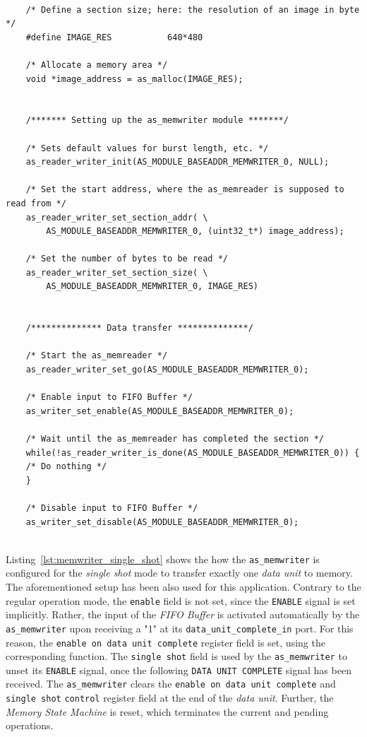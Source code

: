 \begin{footnotesize}
    \begin{lstlisting}[label=lst:memwriter_normal_op]
    
    /* Define a section size; here: the resolution of an image in byte */ 
    #define IMAGE_RES           640*480
    
    /* Allocate a memory area */
    void *image_address = as_malloc(IMAGE_RES);
    
    
    /******* Setting up the as_memwriter module *******/
    
    /* Sets default values for burst length, etc. */
    as_reader_writer_init(AS_MODULE_BASEADDR_MEMWRITER_0, NULL);
    
    /* Set the start address, where the as_memreader is supposed to read from */
    as_reader_writer_set_section_addr( \
        AS_MODULE_BASEADDR_MEMWRITER_0, (uint32_t*) image_address);
    
    /* Set the number of bytes to be read */
    as_reader_writer_set_section_size( \
        AS_MODULE_BASEADDR_MEMWRITER_0, IMAGE_RES)
    
    
    /************** Data transfer **************/
    
    /* Start the as_memreader */
    as_reader_writer_set_go(AS_MODULE_BASEADDR_MEMWRITER_0);
    
    /* Enable input to FIFO Buffer */
    as_writer_set_enable(AS_MODULE_BASEADDR_MEMWRITER_0);
    
    /* Wait until the as_memreader has completed the section */
    while(!as_reader_writer_is_done(AS_MODULE_BASEADDR_MEMWRITER_0)) {
    /* Do nothing */
    }
    
    /* Disable input to FIFO Buffer */
    as_writer_set_disable(AS_MODULE_BASEADDR_MEMWRITER_0);
    
    \end{lstlisting}
\end{footnotesize}

Listing~\ref{lst:memwriter_single_shot} shows the how the \texttt{as\_memwriter} is configured for the \textit{single shot} mode to transfer exactly one \textit{data unit} to memory.
The aforementioned setup has been also used for this application.
Contrary to the regular operation mode, the \texttt{enable} field is not set, since the \texttt{ENABLE} signal is set implicitly. 
Rather, the input of the \textit{FIFO Buffer} is activated automatically by the \texttt{as\_memwriter} upon receiving a "1" at its \texttt{data\_unit\_complete\_in} port.
For this reason, the \texttt{enable on data unit complete} register field is set, using the corresponding function.
The \texttt{single shot} field is used by the \texttt{as\_memwriter} to unset its \texttt{ENABLE} signal, once the following \texttt{DATA UNIT COMPLETE} signal has been received.
The \texttt{as\_memwriter} clears the \texttt{enable on data unit complete} and \texttt{single shot} \texttt{control} register field at the end of the \textit{data unit}.
Further, the \textit{Memory State Machine} is reset, which terminates the current and pending operations.

